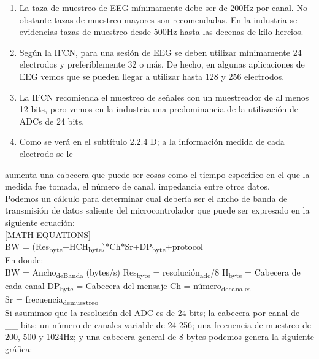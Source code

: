 \begin{enumerate}
\item La taza de muestreo de EEG mínimamente debe ser de 200Hz por canal. No obstante tazas de muestreo mayores son recomendadas. En la industria se evidencias tazas de muestreo desde 500Hz hasta las decenas de kilo hercios.\\
\item Según la IFCN, para una sesión de EEG se deben utilizar mínimamente 24 electrodos y preferiblemente 32 o más. De hecho, en algunas aplicaciones de EEG vemos que se pueden llegar a utilizar hasta 128 y 256 electrodos.\\
\item La IFCN recomienda el muestreo de señales con un muestreador de al menos 12 bits, pero vemos en la industria una predominancia de la utilización de ADCs de 24 bits.\\
\item Como se verá en el subtítulo 2.2.4 D; a la información medida de cada electrodo se le\\
\end{enumerate}
aumenta una cabecera que puede ser cosas como el tiempo específico en el que la medida fue tomada, el número de canal, impedancia entre otros datos.\\
Podemos un cálculo para determinar cual debería ser el ancho de banda de transmisión de datos saliente del microcontrolador que puede ser expresado en la siguiente ecuación:\\

[MATH EQUATIONS]\\
BW = (Res\textsubscript{byte}+HCH\textsubscript{byte})*Ch*Sr+DP\textsubscript{byte}+protocol\\
En donde:\\
BW = Ancho\textsubscript{de}\textsubscript{Banda} (bytes/s) Res\textsubscript{byte} = resolución\textsubscript{adc}/8 H\textsubscript{byte} = Cabecera de cada canal DP\textsubscript{byte} = Cabecera del mensaje Ch = número\textsubscript{de}\textsubscript{canales}\\
Sr = frecuencia\textsubscript{de}\textsubscript{muestreo}\\

Si asumimos que la resolución del ADC es de 24 bits; la cabecera por canal de \_\_ bits; un número de canales variable de 24-256; una frecuencia de muestreo de 200, 500 y 1024Hz; y una cabecera general de 8 bytes podemos genera la siguiente gráfica:\\

